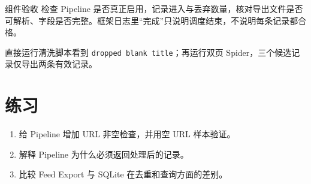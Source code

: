 \begin{method}{组件验收}
检查 Pipeline 是否真正启用，记录进入与丢弃数量，核对导出文件是否可解析、字段是否完整。框架日志里“完成”只说明调度结束，不说明每条记录都合格。
\end{method}

\begin{tcolorbox}[title=本章验收,colframe=Teal,colback=Teal!3]
直接运行清洗脚本看到 \texttt{dropped blank title}；再运行双页 Spider，三个候选记录仅导出两条有效记录。
\end{tcolorbox}

\section{练习}
\begin{enumerate}[label=\arabic*.]
\item 给 Pipeline 增加 URL 非空检查，并用空 URL 样本验证。
\item 解释 Pipeline 为什么必须返回处理后的记录。
\item 比较 Feed Export 与 SQLite 在去重和查询方面的差别。
\end{enumerate}
